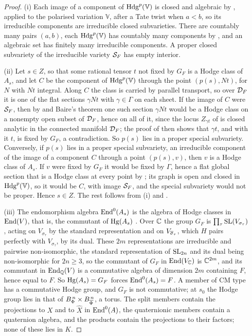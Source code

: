 \begin{proof}
(i) Each image of a component of $\mathrm{Hdg}^{p}(\mathbb{V})$ is closed and
algebraic by , applied to the polarised variation
$\mathbb{V}$, after a Tate twist when $a<b$, so its irreducible
components are irreducible closed subvarieties. There are countably many
pairs $(a,b)$, each $\mathrm{Hdg}^{p}(\mathbb{V})$ has countably many components by
, and an algebraic set has finitely many irreducible
components. A proper closed subvariety of the irreducible variety
$\mathcal{S}_{F}$ has empty interior.

(ii) Let $s\in Z$, so that some rational tensor $t$ not fixed by $G_{F}$ is a
Hodge class of $A_{s}$, and let $C$ be the component of
$\mathrm{Hdg}^{p}(\mathbb{V})$ through the point $(p(s),Nt)$, for $N$ with $Nt$
integral. Along $C$ the class is carried by parallel transport, so over
$\mathcal{D}_{F}$ it is one of the flat sections $\gamma Nt$ with $\gamma\in\Gamma$ on
each sheet. If the image of $C$ were $\mathcal{S}_{F}$, then by 
and Baire's theorem one such section $\gamma Nt$ would be a Hodge class on a
nonempty open subset of $\mathcal{D}_{F}$, hence on all of it, since the locus
$Z_{\gamma t}$ of  is closed analytic in the connected
manifold $\mathcal{D}_{F}$; the proof of  then shows that
$\gamma t$, and with it $t$, is fixed by $G_{F}$, a contradiction. So $p(s)$ lies in a proper
special subvariety. Conversely, if $p(s)$ lies in a proper special
subvariety, an irreducible component of the image of a component $C$
through a point $(p(s),v)$, then $v$ is a Hodge class of $A_{s}$. If $v$
were fixed by $G_{F}$ it would be fixed by $\Gamma$, hence a flat global
section that is a Hodge class at every point by ; its
graph is open and closed in $\mathrm{Hdg}^{p}(\mathbb{V})$, so it would be $C$, with
image $\mathcal{S}_{F}$, and the special subvariety would not be proper. Hence $s\in Z$.
The rest follows from (i) and .

(iii) The endomorphism algebra $\operatorname{End}^{0}(A_{s})$ is the algebra of Hodge
classes in $\operatorname{End}(V)$, that is, the commutant of $\operatorname{Hg}(A_{s})$
\cite[\S3]{Del82}. Over $\mathbb{C}$ the group $G_{F}$ is
$\prod_{\tau}\operatorname{SL}(V_{\sigma_{\tau}})$, acting on $V_{\sigma_{\tau}}$ by the
standard representation and on $V_{\overline{\sigma}_{\tau}}$, which $H$ pairs
perfectly with $V_{\sigma_{\tau}}$, by its dual. These $2m$ representations
are irreducible and pairwise non-isomorphic, the standard representation of
$\operatorname{SL}_{2n}$ and its dual being non-isomorphic for $2n\ge3$, so the commutant
of $G_{F}$ in $\operatorname{End}(V_{\mathbb{C}})$ is $\mathbb{C}^{2m}$, and its commutant in
$\operatorname{End}_{\mathbb{Q}}(V)$ is a commutative algebra of dimension $2m$ containing $F$,
hence equal to $F$. So $\operatorname{Hg}(A_{s})=G_{F}$ forces $\operatorname{End}^{0}(A_{s})=F$. A
member of CM type has a commutative Hodge group, and $G_{F}$ is not
commutative; at $s_{0}$ the Hodge group lies in that of
$B_{\Phi}^{\,n}\times B_{\overline{\Phi}}^{\,n}$, a torus. The split members
contain the projections to $X$ and to $\widehat{X}$ in
$\operatorname{End}^{0}(A)$, the quaternionic members contain a quaternion algebra, and
the products contain the projections to their factors; none of these lies
in $K$.


\end{proof}
